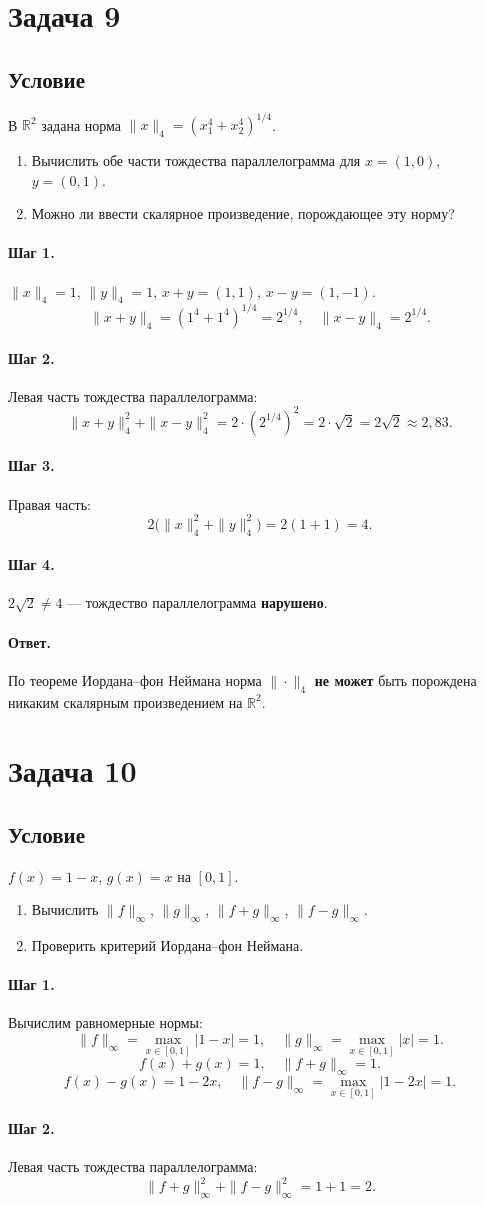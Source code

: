 \documentclass[12pt,a4paper]{article}
\theoremstyle{solution}
\newcommand{\task}[1]{\newpage\section*{Задача #1}}
\newcommand{\answer}{\paragraph{Ответ.}}
\newcommand{\step}[1]{\paragraph{Шаг #1.}}
\newcommand{\R}{\mathbb{R}}
\begin{document}
\task{9}
\subsection*{Условие}
В $\R^2$ задана норма $\|x\|_4=(x_1^4+x_2^4)^{1/4}$.
\begin{enumerate}
\item Вычислить обе части тождества параллелограмма для $x=(1,0)$, $y=(0,1)$.
\item Можно ли ввести скалярное произведение, порождающее эту норму?
\end{enumerate}

\step{1} $\|x\|_4=1$, $\|y\|_4=1$, $x+y=(1,1)$, $x-y=(1,-1)$.
\[
\|x+y\|_4=(1^4+1^4)^{1/4}=2^{1/4},\quad\|x-y\|_4=2^{1/4}.
\]

\step{2} Левая часть тождества параллелограмма:
\[
\|x+y\|_4^2+\|x-y\|_4^2=2\cdot(2^{1/4})^2=2\cdot\sqrt{2}=2\sqrt{2}\approx2{,}83.
\]

\step{3} Правая часть:
\[
2\bigl(\|x\|_4^2+\|y\|_4^2\bigr)=2(1+1)=4.
\]

\step{4} $2\sqrt{2}\neq4$ --- тождество параллелограмма \textbf{нарушено}.

\answer По теореме Иордана--фон Неймана норма $\|\cdot\|_4$ \textbf{не может} быть порождена никаким скалярным произведением на $\R^2$.

\task{10}
\subsection*{Условие}
$f(x)=1-x$, $g(x)=x$ на $[0,1]$.
\begin{enumerate}
\item Вычислить $\|f\|_\infty$, $\|g\|_\infty$, $\|f+g\|_\infty$, $\|f-g\|_\infty$.
\item Проверить критерий Иордана--фон Неймана.
\end{enumerate}

\step{1} Вычислим равномерные нормы:
\[
\|f\|_\infty=\max_{x\in[0,1]}|1-x|=1,\quad
\|g\|_\infty=\max_{x\in[0,1]}|x|=1.
\]
\[
f(x)+g(x)=1,\quad\|f+g\|_\infty=1.
\]
\[
f(x)-g(x)=1-2x,\quad\|f-g\|_\infty=\max_{x\in[0,1]}|1-2x|=1.
\]

\step{2} Левая часть тождества параллелограмма:
\[
\|f+g\|_\infty^2+\|f-g\|_\infty^2=1+1=2.
\]
\end{document}
